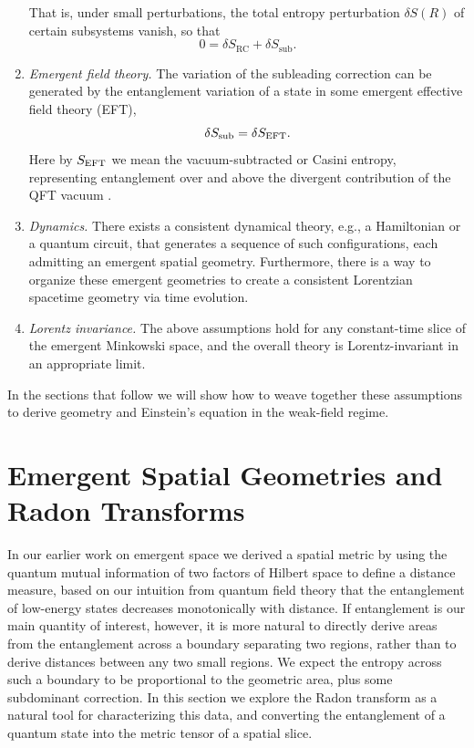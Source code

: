 \documentclass[%
preprint,
nofootinbib,
amsmath,amssymb,
aps,
prd,
showpacs,
superscriptaddress
]{revtex4-1}
\begin{document}
\begin{enumerate}[label=\textnormal{(A\arabic*)}]
That is, under small perturbations, the total entropy perturbation $\delta S(R)$ of certain subsystems vanish, so that \label{itm:4}
\begin{equation}
  0 = \delta S_{\mathrm{RC}} +\delta S_\mathrm{sub}.
\end{equation}
 \item \emph{Emergent field theory.}
 The variation of the subleading correction can be generated by the entanglement variation of a state in some emergent effective field theory (EFT), \label{itm:5} 
 \begin{equation}
 \delta S_{\rm sub}=\delta S_{\rm EFT}.
 \end{equation}
Here by $S_{\rm EFT}$ we mean the vacuum-subtracted or Casini entropy, representing entanglement over and above the divergent contribution of the QFT vacuum \cite{Casini:2008cr,Bousso:2014sda,Bousso:2014uxa}.
 \item \emph{Dynamics.}
 There exists a consistent dynamical theory, e.g., a Hamiltonian or a quantum circuit, that generates a sequence of such configurations, each admitting an emergent spatial geometry. Furthermore, there is a  way to organize these emergent geometries to create a consistent Lorentzian spacetime geometry via time evolution. 
\label{itm:6}
 \item \emph{Lorentz invariance.}
The above assumptions hold for any constant-time slice of the emergent Minkowski space, and the overall theory is Lorentz-invariant in an appropriate limit. \label{itm:7}
\end{enumerate}

In the sections that follow we will show how to weave together these assumptions to derive geometry and Einstein's equation in the weak-field regime.

\section{Emergent Spatial Geometries and Radon Transforms}\label{sec:emergentspace}

In our earlier work on emergent space \cite{Cao:2016mst} we derived a spatial metric by using the quantum mutual information of two factors of Hilbert space to define a distance measure, based on our intuition from quantum field theory that the entanglement of low-energy states decreases monotonically with distance.
If entanglement is our main quantity of interest, however, it is more natural to directly derive areas from the entanglement across a boundary separating two regions, rather than to derive distances between any two small regions. 
We expect the entropy across such a boundary to be proportional to the geometric area, plus some subdominant correction.
In this section we explore the Radon transform as a natural tool for characterizing this data, and converting the entanglement of a quantum state into the metric tensor of a spatial slice.
\end{document}
